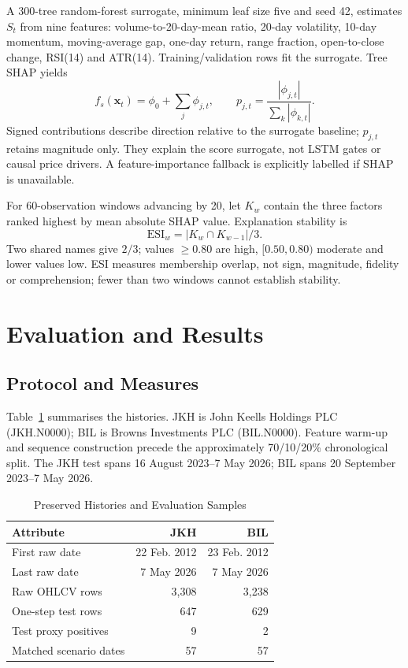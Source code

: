 \documentclass[conference]{IEEEtran}
\begin{document}
A 300-tree random-forest surrogate, minimum leaf size five and seed 42, estimates $S_t$ from nine features: volume-to-20-day-mean ratio, 20-day volatility, 10-day momentum, moving-average gap, one-day return, range fraction, open-to-close change, RSI(14) and ATR(14). Training/validation rows fit the surrogate. Tree SHAP yields
\begin{equation}
f_s(\mathbf{x}_t)=\phi_0+\sum_j\phi_{j,t},\qquad
p_{j,t}=\frac{|\phi_{j,t}|}{\sum_k|\phi_{k,t}|}.
\label{eq:shap}
\end{equation}
Signed contributions describe direction relative to the surrogate baseline; $p_{j,t}$ retains magnitude only. They explain the score surrogate, not LSTM gates or causal price drivers. A feature-importance fallback is explicitly labelled if SHAP is unavailable.

For 60-observation windows advancing by 20, let $K_w$ contain the three factors ranked highest by mean absolute SHAP value. Explanation stability is
\begin{equation}
\mathrm{ESI}_w=|K_w\cap K_{w-1}|/3.
\label{eq:esi}
\end{equation}
Two shared names give $2/3$; values $\ge0.80$ are high, $[0.50,0.80)$ moderate and lower values low. ESI measures membership overlap, not sign, magnitude, fidelity or comprehension; fewer than two windows cannot establish stability.

\section{Evaluation and Results}
\subsection{Protocol and Measures}
Table~\ref{tab:data} summarises the histories. JKH is John Keells Holdings PLC (JKH.N0000); BIL is Browns Investments PLC (BIL.N0000). Feature warm-up and sequence construction precede the approximately 70/10/20\% chronological split. The JKH test spans 16 August 2023--7 May 2026; BIL spans 20 September 2023--7 May 2026.

\begin{table}[!t]
\caption{Preserved Histories and Evaluation Samples}
\label{tab:data}
\centering\footnotesize
\begin{tabular}{@{}lrr@{}}\toprule
Attribute & JKH & BIL\\\midrule
First raw date & 22 Feb. 2012 & 23 Feb. 2012\\
Last raw date & 7 May 2026 & 7 May 2026\\
Raw OHLCV rows & 3,308 & 3,238\\
One-step test rows & 647 & 629\\
Test proxy positives & 9 & 2\\
Matched scenario dates & 57 & 57\\\bottomrule
\end{tabular}
\end{table}
\end{document}

